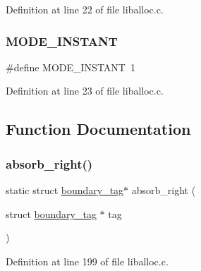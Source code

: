 Definition at line 22 of file liballoc.\+c.

\mbox{\label{a00023_aedc513524290b468e893e1bc4f5cba2f_aedc513524290b468e893e1bc4f5cba2f}} 
\subsubsection{\texorpdfstring{M\+O\+D\+E\+\_\+\+I\+N\+S\+T\+A\+NT}{MODE\_INSTANT}}
{\footnotesize\ttfamily \#define M\+O\+D\+E\+\_\+\+I\+N\+S\+T\+A\+NT~1}



Definition at line 23 of file liballoc.\+c.



\subsection{Function Documentation}
\mbox{\label{a00023_a9d9646746f3401f7c03ff66cba7315c8_a9d9646746f3401f7c03ff66cba7315c8}} 
\subsubsection{\texorpdfstring{absorb\+\_\+right()}{absorb\_right()}}
{\footnotesize\ttfamily static struct \hyperlink{a00095}{boundary\+\_\+tag}$\ast$ absorb\+\_\+right (\begin{DoxyParamCaption}\item[{struct \hyperlink{a00095}{boundary\+\_\+tag} $\ast$}]{tag }\end{DoxyParamCaption})\hspace{0.3cm}{\ttfamily [static]}}



Definition at line 199 of file liballoc.\+c.


